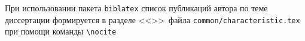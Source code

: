 При использовании пакета \verb!biblatex! список публикаций автора по теме
диссертации формируется в разделе <<\publications>>\ файла
\verb!common/characteristic.tex!  при помощи команды \verb!\nocite!

